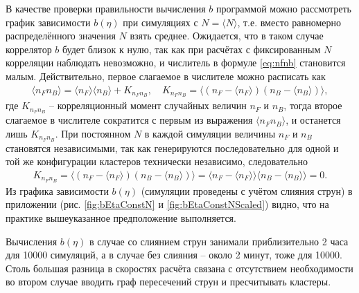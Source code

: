 В качестве проверки правильности вычисления $b$ программой можно рассмотреть график зависимости $b(\eta)$ при симуляциях с $N = \langle N \rangle$, т.е. вместо равномерно распределённого значения $N$ взять среднее. Ожидается, что в таком случае коррелятор $b$ будет близок к нулю, так как при расчётах с фиксированным $N$ корреляции наблюдать невозможно, и числитель в формуле \ref{eq:nfnb} становится малым. Действительно, первое слагаемое в числителе можно расписать как
\begin{align*}
	\langle n_F n_B \rangle = \langle n_F \rangle \langle n_B \rangle + K_{n_F n_B}, \quad K_{n_F n_B} = \langle (n_F - \langle n_F \rangle)(n_B - \langle n_B \rangle) \rangle,
\end{align*}
где $K_{n_F n_B}$ -- корреляционный момент случайных величин $n_F$ и $n_B$, тогда второе слагаемое в числителе сократится с первым из выражения $\langle n_F n_B \rangle$, и останется лишь $K_{n_F n_B}$. При постоянном $N$ в каждой симуляции величины $n_F$ и $n_B$ становятся независимыми, так как генерируются последовательно для одной и той же конфигурации кластеров технически независимо, следовательно
\begin{align*}
	K_{n_F n_B} = \langle (n_F - \langle n_F \rangle)(n_B - \langle n_B \rangle) \rangle = \langle n_F - \langle n_F \rangle \rangle \langle n_B - \langle n_B \rangle \rangle = 0.
\end{align*}
Из графика зависимости $b(\eta)$ (симуляции проведены с учётом слияния струн) в приложении (рис. \ref{fig:bEtaConstN} и \ref{fig:bEtaConstNScaled}) видно, что на практике вышеуказанное предположение выполняется.

Вычисления $b(\eta)$ в случае со слиянием струн занимали приблизительно 2 часа для 10000 симуляций, а в случае без слияния -- около 2 минут, тоже для 10000. Столь большая разница в скоростях расчёта связана с отсутствием необходимости во втором случае вводить граф пересечений струн и пресчитывать кластеры.
